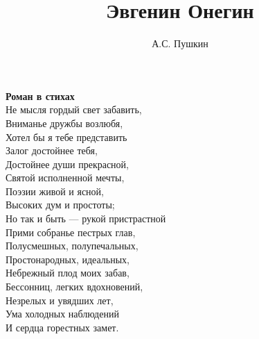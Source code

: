 \documentclass[10pt,a4paper]{book}
\title{Эвгенин Онегин}
\author{А.С. Пушкин}
\begin{document}
\maketitle
\textbf{Роман в стихах}\\
Не мысля гордый свет забавить,\\
Вниманье дружбы возлюбя,\\
Хотел бы я тебе представить\\
Залог достойнее тебя,\\
Достойнее души прекрасной,\\
Святой исполненной мечты,\\
Поэзии живой и ясной,\\
Высоких дум и простоты;\\
Но так и быть — рукой пристрастной\\
Прими собранье пестрых глав,\\
Полусмешных, полупечальных,\\
Простонародных, идеальных,\\
Небрежный плод моих забав,\\
Бессонниц, легких вдохновений,\\
Незрелых и увядших лет,\\
Ума холодных наблюдений\\
И сердца горестных замет.


\end{document}
